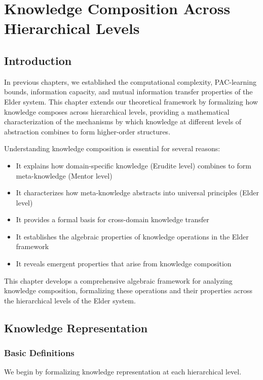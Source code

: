 \chapter{Knowledge Composition Across Hierarchical Levels}

\section{Introduction}

In previous chapters, we established the computational complexity, PAC-learning bounds, information capacity, and mutual information transfer properties of the Elder system. This chapter extends our theoretical framework by formalizing how knowledge composes across hierarchical levels, providing a mathematical characterization of the mechanisms by which knowledge at different levels of abstraction combines to form higher-order structures.

Understanding knowledge composition is essential for several reasons:

\begin{itemize}
    \item It explains how domain-specific knowledge (Erudite level) combines to form meta-knowledge (Mentor level)
    \item It characterizes how meta-knowledge abstracts into universal principles (Elder level)
    \item It provides a formal basis for cross-domain knowledge transfer
    \item It establishes the algebraic properties of knowledge operations in the Elder framework
    \item It reveals emergent properties that arise from knowledge composition
\end{itemize}

This chapter develops a comprehensive algebraic framework for analyzing knowledge composition, formalizing these operations and their properties across the hierarchical levels of the Elder system.

\section{Knowledge Representation}

\subsection{Basic Definitions}

We begin by formalizing knowledge representation at each hierarchical level.

